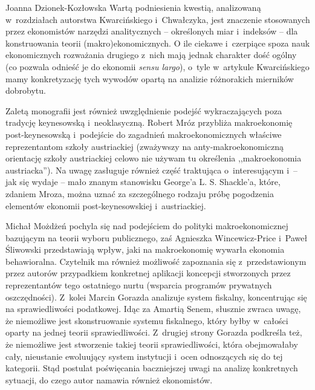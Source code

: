 \begin{recplenv}{Joanna Dzionek-Kozłowska}
Wartą podniesienia kwestią, analizowaną w~rozdziałach autorstwa Kwarcińskiego i~Chwałczyka, jest znaczenie stosowanych
przez ekonomistów narzędzi analitycznych -- określonych miar i~indeksów -- dla konstruowania teorii (makro)ekonomicznych.
O ile ciekawe i~czerpiące spoza nauk ekonomicznych rozważania drugiego z~nich mają jednak charakter dość ogólny (co
pozwala odnieść je do ekonomii \textit{sensu largo}), o~tyle w~artykule Kwarcińskiego mamy konkretyzację tych wywodów
opartą na analizie różnorakich mierników dobrobytu. 

Zaletą monografii jest również uwzględnienie podejść wykraczających poza tradycję keynesowską i~neoklasyczną. Robert
Mróz przybliża makroekonomię post-keynesowską i~podejście do zagadnień makroekonomicznych właściwe reprezentantom
szkoły austriackiej (zważywszy na anty-makroekonomiczną orientację szkoły austriackiej celowo nie używam tu określenia
,,makroekonomia austriacka''). Na uwagę zasługuje również część traktująca o~interesującym i~-- jak się wydaje -- mało
znanym stanowisku George’a L. S. Shackle’a, które, zdaniem Mroza, można uznać za szczególnego rodzaju próbę pogodzenia
elementów ekonomii post-keynesowskiej i~austriackiej. 

Michał Możdżeń pochyla się nad podejściem do polityki makroekonomicznej bazującym na teorii wyboru publicznego, zaś
Agnieszka Wincewicz-Price i~Paweł Śliwowski przedstawiają wpływ, jaki na makroekonomię wywarła ekonomia behawioralna.
Czytelnik ma również możliwość zapoznania się z~przedstawionym przez autorów przypadkiem konkretnej aplikacji koncepcji
stworzonych przez reprezentantów tego ostatniego nurtu (wsparcia programów prywatnych oszczędności). Z~kolei Marcin
Gorazda analizuje system fiskalny, koncentrując się na sprawiedliwości podatkowej. Idąc za Amartią Senem, słusznie
zwraca uwagę, że niemożliwe jest skonstruowanie systemu fiskalnego, który byłby w~całości oparty na jednej teorii
sprawiedliwości. Z~drugiej strony Gorazda podkreśla też, że niemożliwe jest stworzenie takiej teorii sprawiedliwości,
która obejmowałaby cały, nieustanie ewoluujący system instytucji i~ocen odnoszących się do tej kategorii. Stąd postulat
poświęcania baczniejszej uwagi na analizę konkretnych sytuacji, do czego autor namawia również ekonomistów.


\end{recplenv}

